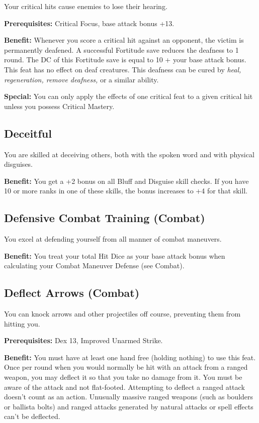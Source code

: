 				
Your critical hits cause enemies to lose their hearing.
				
\textbf{Prerequisites:} Critical Focus, base attack bonus +13.
				
\textbf{Benefit:} Whenever you score a critical hit against an opponent, the victim is permanently deafened. A successful Fortitude save reduces the deafness to 1 round. The DC of this Fortitude save is equal to 10 + your base attack bonus. This feat has no effect on deaf creatures. This deafness can be cured by \textit{heal, regeneration, remove deafness, }or a similar ability.
				
\textbf{Special:} You can only apply the effects of one critical feat to a given critical hit unless you possess Critical Mastery.
				
\subsection{Deceitful}

				
You are skilled at deceiving others, both with the spoken word and with physical disguises.
				
\textbf{Benefit:} You get a +2 bonus on all Bluff and Disguise skill checks. If you have 10 or more ranks in one of these skills, the bonus increases to +4 for that skill.
				
\subsection{Defensive Combat Training (Combat)}

				
You excel at defending yourself from all manner of combat maneuvers.
				
\textbf{Benefit:} You treat your total Hit Dice as your base attack bonus when calculating your Combat Maneuver Defense (see Combat). 
				
\subsection{Deflect Arrows (Combat)}

				
You can knock arrows and other projectiles off course, preventing them from hitting you.
				
\textbf{Prerequisites:} Dex 13, Improved Unarmed Strike.
				
\textbf{Benefit:} You must have at least one hand free (holding nothing) to use this feat. Once per round when you would normally be hit with an attack from a ranged weapon, you may deflect it so that you take no damage from it. You must be aware of the attack and not flat-footed. Attempting to deflect a ranged attack doesn't count as an action. Unusually massive ranged weapons (such as boulders or ballista bolts) and ranged attacks generated by natural attacks or spell effects can't be deflected.
				
